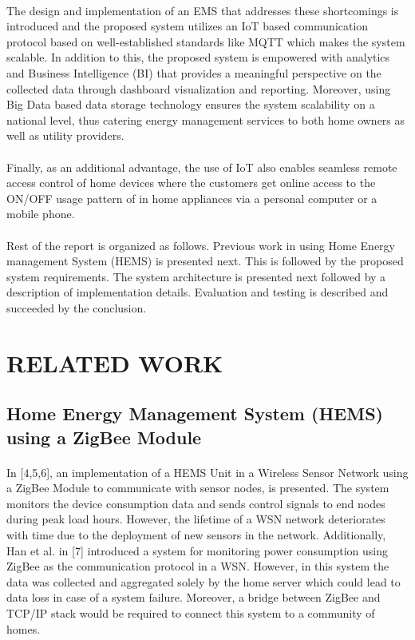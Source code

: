 \documentclass[a4paper,12pt,oneside]{article}
\begin{document}
\paragraph{}
The design and implementation of an EMS that addresses these shortcomings is
introduced and the proposed system utilizes an IoT based communication protocol
based on well-established standards like MQTT which makes the system scalable. In addition to this, the proposed system is
empowered with analytics and Business Intelligence (BI) that
provides a meaningful perspective on the collected data through
dashboard visualization and reporting. Moreover, using Big
Data based data storage technology ensures the system
scalability on a national level, thus catering energy management
services to both home owners as well as utility providers.
\paragraph{}
Finally, as
an additional advantage, the use of IoT also enables seamless
remote access control of home devices where the customers
get online access to the ON/OFF usage pattern of in home
appliances via a personal computer or a mobile phone.
\paragraph{}
Rest of the report is organized as follows. Previous work in
using Home Energy management System (HEMS) is
presented next. This is followed by the proposed system
requirements. The system architecture is presented next
followed by a description of implementation details.
Evaluation and testing is described and succeeded by the
conclusion.

\newpage
\section{RELATED WORK}
\subsection{Home Energy Management System (HEMS) using a ZigBee Module}
\paragraph{}
In [4,5,6], an
implementation of a HEMS Unit in a Wireless Sensor
Network using a ZigBee Module to communicate with sensor
nodes, is presented. The system monitors the device
consumption data and sends control signals to end nodes
during peak load hours. However, the lifetime of a WSN
network deteriorates with time due to the deployment of new
sensors in the network. Additionally, Han et al. in [7]
introduced a system for monitoring power consumption using
ZigBee as the communication protocol in a WSN. However,
in this system the data was collected and aggregated solely by
the home server which could lead to data loss in case of a
system failure. Moreover, a bridge between ZigBee and
TCP/IP stack would be required to connect this system to a
community of homes.
\end{document}
